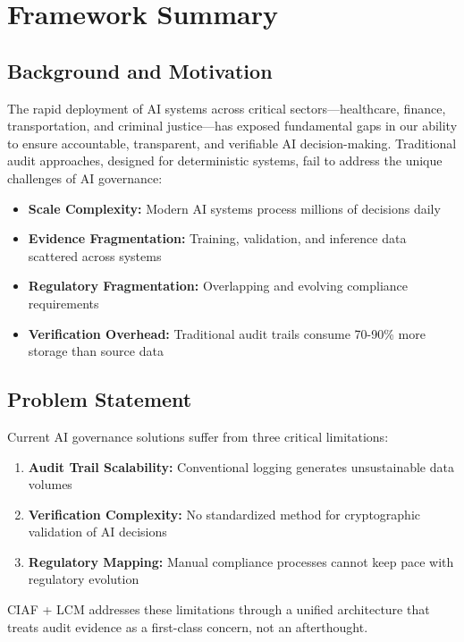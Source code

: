 \documentclass[12pt,a4paper]{article}
\begin{document}
\section{Framework Summary}

\subsection{Background and Motivation}

The rapid deployment of AI systems across critical sectors—healthcare, finance, transportation, and criminal justice—has exposed fundamental gaps in our ability to ensure accountable, transparent, and verifiable AI decision-making. Traditional audit approaches, designed for deterministic systems, fail to address the unique challenges of AI governance:

\begin{itemize}
\item \textbf{Scale Complexity:} Modern AI systems process millions of decisions daily
\item \textbf{Evidence Fragmentation:} Training, validation, and inference data scattered across systems
\item \textbf{Regulatory Fragmentation:} Overlapping and evolving compliance requirements
\item \textbf{Verification Overhead:} Traditional audit trails consume 70-90\% more storage than source data
\end{itemize}

\subsection{Problem Statement}

Current AI governance solutions suffer from three critical limitations:

\begin{enumerate}
\item \textbf{Audit Trail Scalability:} Conventional logging generates unsustainable data volumes
\item \textbf{Verification Complexity:} No standardized method for cryptographic validation of AI decisions
\item \textbf{Regulatory Mapping:} Manual compliance processes cannot keep pace with regulatory evolution
\end{enumerate}

CIAF + LCM addresses these limitations through a unified architecture that treats audit evidence as a first-class concern, not an afterthought.
\end{document}
